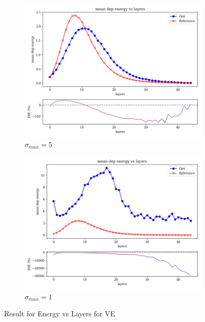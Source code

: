 \begin{figure}[bthp]
\begin{subfigure}[b]{0.23\textwidth}
        \centering
        \includegraphics[width=\textwidth]{Figures/ve5_3.png}
        \caption{$\sigma_{max}=5$}
        \label{fig:ve5_3}
    \end{subfigure}
    \hfill
    \begin{subfigure}[b]{0.23\textwidth}  %
        \centering
        \includegraphics[width=\textwidth]{Figures/ve1_3.png}
        \caption{$\sigma_{max}=1$}
        \label{fig:ve1_3}
    \end{subfigure}
    \caption{Result for Energy vs Layers for VE}
\end{figure}

